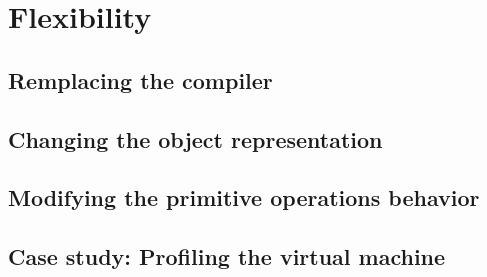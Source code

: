 \chapter{Flexibility}
\label{chap:Flexibility}

\section{Remplacing the compiler}

\section{Changing the object representation}

\section{Modifying the primitive operations behavior}

\section{Case study: Profiling the virtual machine}
